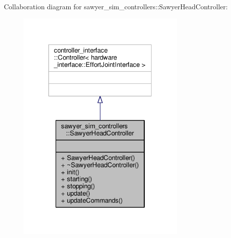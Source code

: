 Collaboration diagram for sawyer\-\_\-sim\-\_\-controllers\-:\-:Sawyer\-Head\-Controller\-:
\nopagebreak
\begin{figure}[H]
\begin{center}
\leavevmode
\includegraphics[width=236pt]{classsawyer__sim__controllers_1_1_sawyer_head_controller__coll__graph}
\end{center}
\end{figure}
